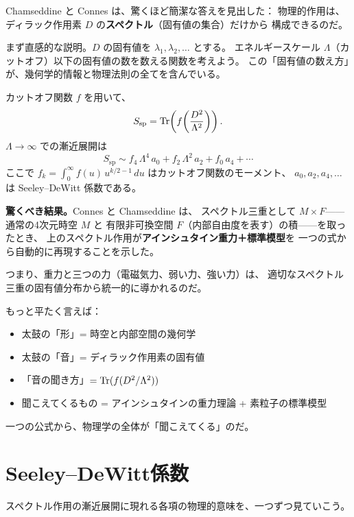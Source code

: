 Chamseddine と Connes は、驚くほど簡潔な答えを見出した：
物理的作用は、ディラック作用素 $D$ の\textbf{スペクトル}（固有値の集合）だけから
構成できるのだ。

まず直感的な説明。$D$ の固有値を $\lambda_1, \lambda_2, \ldots$ とする。
エネルギースケール $\Lambda$（カットオフ）以下の固有値の数を数える関数を考えよう。
この「固有値の数え方」が、幾何学的情報と物理法則の全てを含んでいる。

\begin{keybox}
カットオフ関数 $f$ を用いて、
\[
  S_{\mathrm{sp}} = \operatorname{Tr}\!\left(f\!\left(\frac{D^2}{\Lambda^2}\right)\right).
\]
$\Lambda\to\infty$ での漸近展開は
\[
  S_{\mathrm{sp}} \sim f_4\,\Lambda^4\, a_0
                     + f_2\,\Lambda^2\, a_2
                     + f_0\, a_4
                     + \cdots
\]
ここで $f_k = \int_0^\infty f(u)\, u^{k/2-1}\, du$ はカットオフ関数のモーメント、
$a_0, a_2, a_4, \ldots$ は Seeley--DeWitt 係数である。
\end{keybox}

\noindent\textbf{驚くべき結果。}Connes と Chamseddine は、
スペクトル三重として $M\times F$——通常の4次元時空 $M$ と
有限非可換空間 $F$（内部自由度を表す）の積——を取ったとき、
上のスペクトル作用が\textbf{アインシュタイン重力＋標準模型}を
一つの式から自動的に再現することを示した。

つまり、重力と三つの力（電磁気力、弱い力、強い力）は、
適切なスペクトル三重の固有値分布から統一的に導かれるのだ。

\begin{hsbox}
もっと平たく言えば：
\begin{itemize}
  \item 太鼓の「形」= 時空と内部空間の幾何学
  \item 太鼓の「音」= ディラック作用素の固有値
  \item 「音の聞き方」$= \operatorname{Tr}(f(D^2/\Lambda^2))$
  \item 聞こえてくるもの = アインシュタインの重力理論 + 素粒子の標準模型
\end{itemize}
一つの公式から、物理学の全体が「聞こえてくる」のだ。
\end{hsbox}

\section{Seeley--DeWitt係数}
\label{sec:3.3}

スペクトル作用の漸近展開に現れる各項の物理的意味を、一つずつ見ていこう。

